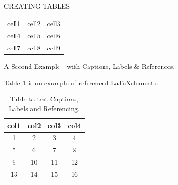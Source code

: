 \documentclass[12pt, letterpaper, twoside]{article}
\begin{document}
CREATING TABLES - 
\begin{center}
\begin{tabular}{|c|c|c|}
\hline
cell1 & cell2 & cell3 \\
cell4 & cell5 & cell6 \\
cell7 & cell8 & cell9 \\
\hline
\end{tabular}    
\end{center}


A Second Example - with Captions, Labels \& References.

Table \ref{table1} is an example of referenced \LaTeX elements.
    \begin{table}[h!]
    \centering
    \begin{tabular}{||c|c|c|c||}
    \hline
    col1 & col2 & col3 & col4 \\[0.5ex]
    \hline\hline
    1 & 2 & 3 & 4 \\
    5 & 6 & 7 & 8 \\
    9 & 10 & 11 & 12 \\
    13 & 14 & 15 & 16 \\[0.5ex]
    \hline
    \end{tabular}
    \caption{Table to test Captions, Labels and Referencing.}
    \label{table1}
    \end{table}
\end{document}
